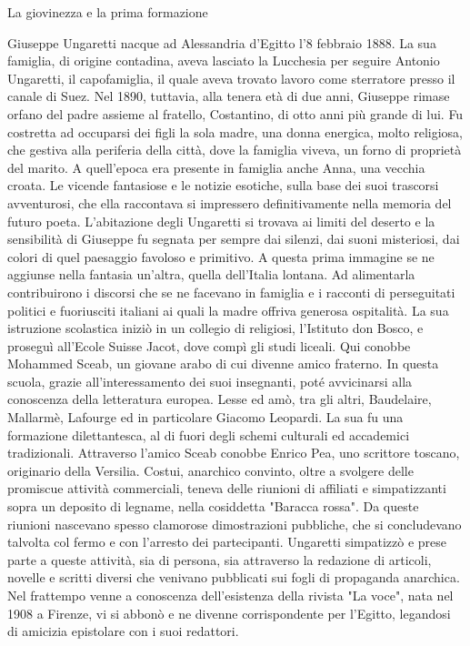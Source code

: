 La giovinezza e la prima formazione

Giuseppe Ungaretti nacque ad Alessandria d'Egitto l'8 febbraio 1888. La sua famiglia, di origine contadina, aveva lasciato la Lucchesia per seguire Antonio Ungaretti, il capofamiglia, il quale aveva trovato lavoro come sterratore presso il canale di Suez. Nel 1890, tuttavia, alla tenera età di due anni, Giuseppe rimase orfano del padre assieme al fratello, Costantino, di otto anni più grande di lui. Fu costretta ad occuparsi dei figli la sola madre, una donna energica, molto religiosa, che gestiva alla periferia della città, dove la famiglia viveva, un forno di proprietà del marito. A quell'epoca era presente in famiglia anche Anna, una vecchia croata. Le vicende fantasiose e le notizie esotiche, sulla base dei suoi trascorsi avventurosi, che ella raccontava si impressero definitivamente nella memoria del futuro poeta. L'abitazione degli Ungaretti si trovava ai limiti del deserto e la sensibilità di Giuseppe fu segnata per sempre dai silenzi, dai suoni misteriosi, dai colori di quel paesaggio favoloso e primitivo. A questa prima immagine se ne aggiunse nella fantasia un'altra, quella dell'Italia lontana. Ad alimentarla contribuirono i discorsi che se ne facevano in famiglia e i racconti di perseguitati politici e fuoriusciti italiani ai quali la madre offriva generosa ospitalità. La sua istruzione scolastica iniziò in un collegio di religiosi, l'Istituto don Bosco, e proseguì all'Ecole Suisse Jacot, dove compì gli studi liceali. Qui conobbe Mohammed Sceab, un giovane arabo di cui divenne amico fraterno. In questa scuola, grazie all'interessamento dei suoi insegnanti, poté avvicinarsi alla conoscenza della letteratura europea. Lesse ed amò, tra gli altri, Baudelaire, Mallarmè, Lafourge ed in particolare Giacomo Leopardi. La sua fu una formazione dilettantesca, al di fuori degli schemi culturali ed accademici tradizionali. Attraverso l'amico Sceab conobbe Enrico Pea, uno scrittore toscano, originario della Versilia. Costui, anarchico convinto, oltre a svolgere delle promiscue attività commerciali, teneva delle riunioni di affiliati e simpatizzanti sopra un deposito di legname, nella cosiddetta "Baracca rossa". Da queste riunioni nascevano spesso clamorose dimostrazioni pubbliche, che si concludevano talvolta col fermo e con l'arresto dei partecipanti. Ungaretti simpatizzò e prese parte a queste attività, sia di persona, sia attraverso la redazione di articoli, novelle e scritti diversi che venivano pubblicati sui fogli di propaganda anarchica. Nel frattempo venne a conoscenza dell'esistenza della rivista "La voce", nata nel 1908 a Firenze, vi si abbonò e ne divenne corrispondente per l'Egitto, legandosi di amicizia epistolare con i suoi redattori.
